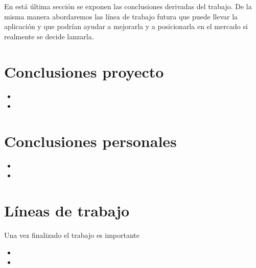 
En está última sección se exponen las conclusiones derivadas del trabajo. De la misma manera abordaremos las línea de trabajo futura que puede llevar la aplicación y que podrían ayudar a mejorarla y a posicionarla en el mercado si realmente se decide lanzarla.


  \section{Conclusiones proyecto}\label{conclusiones_proyecto}
  
\begin{itemize}
	\item
	\item
\end{itemize}
  
  \section{Conclusiones personales}\label{conclusiones_personales}
    
\begin{itemize}
	\item
	\item
\end{itemize}
  
   \section{Líneas de trabajo}\label{lineas_futuras}
   Una vez finalizado el trabajo es importante 
  
\begin{itemize}
	\item
	\item
\end{itemize}